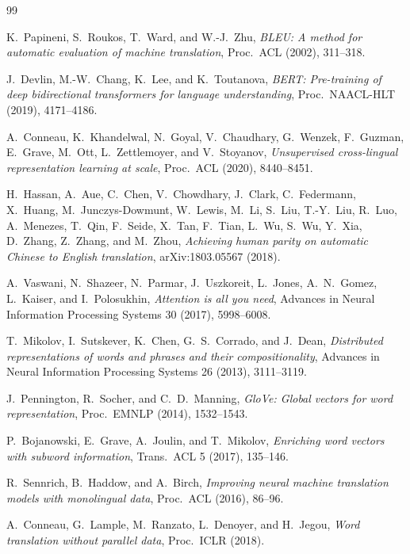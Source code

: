 \documentclass[12pt,a4paper]{article}
\theoremstyle{remark}
\begin{document}
\begin{thebibliography}{99}

K.~Papineni, S.~Roukos, T.~Ward, and W.-J.~Zhu,
\emph{BLEU: A method for automatic evaluation of machine translation},
Proc.\ ACL (2002), 311--318.

J.~Devlin, M.-W.~Chang, K.~Lee, and K.~Toutanova,
\emph{BERT: Pre-training of deep bidirectional transformers for
  language understanding},
Proc.\ NAACL-HLT (2019), 4171--4186.

A.~Conneau, K.~Khandelwal, N.~Goyal, V.~Chaudhary, G.~Wenzek,
  F.~Guzman, E.~Grave, M.~Ott, L.~Zettlemoyer, and V.~Stoyanov,
\emph{Unsupervised cross-lingual representation learning at scale},
Proc.\ ACL (2020), 8440--8451.

H.~Hassan, A.~Aue, C.~Chen, V.~Chowdhary, J.~Clark, C.~Federmann,
  X.~Huang, M.~Junczys-Dowmunt, W.~Lewis, M.~Li, S.~Liu, T.-Y.~Liu,
  R.~Luo, A.~Menezes, T.~Qin, F.~Seide, X.~Tan, F.~Tian, L.~Wu,
  S.~Wu, Y.~Xia, D.~Zhang, Z.~Zhang, and M.~Zhou,
\emph{Achieving human parity on automatic Chinese to English translation},
arXiv:1803.05567 (2018).

A.~Vaswani, N.~Shazeer, N.~Parmar, J.~Uszkoreit, L.~Jones,
  A.~N.~Gomez, L.~Kaiser, and I.~Polosukhin,
\emph{Attention is all you need},
Advances in Neural Information Processing Systems 30 (2017), 5998--6008.

T.~Mikolov, I.~Sutskever, K.~Chen, G.~S.~Corrado, and J.~Dean,
\emph{Distributed representations of words and phrases and their
  compositionality},
Advances in Neural Information Processing Systems 26 (2013), 3111--3119.

J.~Pennington, R.~Socher, and C.~D.~Manning,
\emph{GloVe: Global vectors for word representation},
Proc.\ EMNLP (2014), 1532--1543.

P.~Bojanowski, E.~Grave, A.~Joulin, and T.~Mikolov,
\emph{Enriching word vectors with subword information},
Trans.\ ACL 5 (2017), 135--146.

R.~Sennrich, B.~Haddow, and A.~Birch,
\emph{Improving neural machine translation models with monolingual data},
Proc.\ ACL (2016), 86--96.

A.~Conneau, G.~Lample, M.~Ranzato, L.~Denoyer, and H.~Jegou,
\emph{Word translation without parallel data},
Proc.\ ICLR (2018).


\end{thebibliography}
\end{document}
